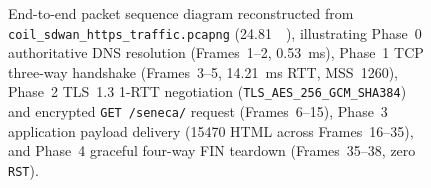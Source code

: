 \begin{figure}[htbp]
{%
}
\caption{End-to-end packet sequence diagram reconstructed from \texttt{coil\_sdwan\_https\_traffic.pcapng} (\qty{24.81}{\kilo\byte}), illustrating Phase~0 authoritative DNS resolution (Frames~1--2, \qty{0.53}{\milli\second}), Phase~1 TCP three-way handshake (Frames~3--5, \qty{14.21}{\milli\second} RTT, MSS~\qty{1260}{\byte}), Phase~2 TLS~1.3 1-RTT negotiation (\texttt{TLS\_AES\_256\_GCM\_SHA384}) and encrypted \texttt{GET /seneca/} request (Frames~6--15), Phase~3 application payload delivery (\qty{15470}{\byte} HTML across Frames~16--35), and Phase~4 graceful four-way FIN teardown (Frames~35--38, zero \texttt{RST}).}
\label{fig:tcp_tls_sequence}
\end{figure}
